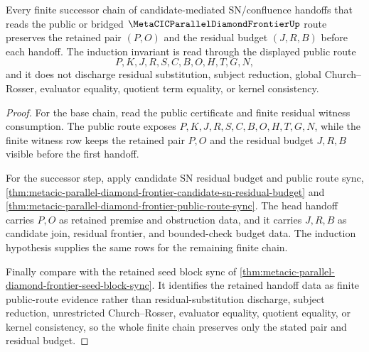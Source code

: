 \begin{theorem}
\label{thm:metacic-parallel-diamond-frontier-retained-pair-induction}
Every finite successor chain of candidate-mediated SN/confluence handoffs that reads the public or bridged $\MetaCICParallelDiamondFrontierUp$ route preserves the retained pair $(P,O)$ and the residual budget $(J,R,B)$ before each handoff. The induction invariant is read through the displayed public route
$$
P,K,J,R,S,C,B,O,H,T,G,N,
$$
and it does not discharge residual substitution, subject reduction, global Church--Rosser, evaluator equality, quotient term equality, or kernel consistency.
\end{theorem}
\begin{proof}
For the base chain, read the public certificate and finite residual witness consumption. The public route exposes $P,K,J,R,S,C,B,O,H,T,G,N$, while the finite witness row keeps the retained pair $P,O$ and the residual budget $J,R,B$ visible before the first handoff.

For the successor step, apply candidate SN residual budget and public route sync, \autoref{thm:metacic-parallel-diamond-frontier-candidate-sn-residual-budget} and \autoref{thm:metacic-parallel-diamond-frontier-public-route-sync}. The head handoff carries $P,O$ as retained premise and obstruction data, and it carries $J,R,B$ as candidate join, residual frontier, and bounded-check budget data. The induction hypothesis supplies the same rows for the remaining finite chain.

Finally compare with the retained seed block sync of \autoref{thm:metacic-parallel-diamond-frontier-seed-block-sync}. It identifies the retained handoff data as finite public-route evidence rather than residual-substitution discharge, subject reduction, unrestricted Church--Rosser, evaluator equality, quotient equality, or kernel consistency, so the whole finite chain preserves only the stated pair and residual budget.
\end{proof}
